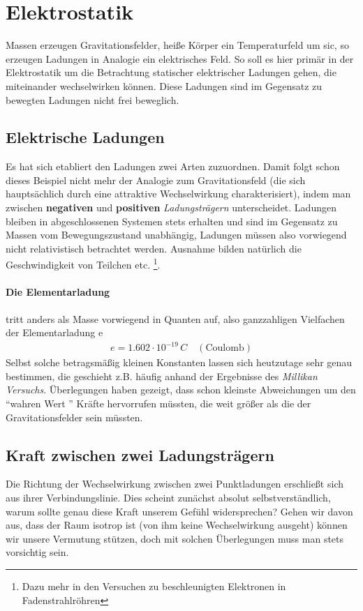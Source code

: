 \section{Elektrostatik}
\label{Elektrostatik}Massen erzeugen Gravitationsfelder, heiße Körper ein Temperaturfeld um sic, so erzeugen Ladungen in Analogie ein elektrisches Feld. So soll es hier primär in der Elektrostatik um die Betrachtung statischer elektrischer Ladungen gehen, die miteinander wechselwirken können. Diese Ladungen sind im Gegensatz zu bewegten Ladungen nicht frei beweglich.
\subsection{Elektrische Ladungen}
Es hat sich etabliert den Ladungen zwei Arten zuzuordnen. Damit folgt schon dieses Beispiel nicht mehr der Analogie zum Gravitationsfeld (die sich hauptsächlich  durch eine attraktive Wechselwirkung charakterisiert), indem man zwischen \textbf{negativen} und \textbf{positiven} \textit{Ladungsträgern} unterscheidet. Ladungen bleiben in abgeschlossenen Systemen stets erhalten und sind im Gegensatz zu Massen vom Bewegungszustand unabhängig, Ladungen müssen also vorwiegend nicht relativistisch betrachtet werden. Ausnahme bilden natürlich die Geschwindigkeit von Teilchen etc. \footnote{Dazu mehr in den Versuchen zu beschleunigten Elektronen in Fadenstrahlröhren}. \\
\begin{center}\end{center}
%
%
\paragraph{Die Elementarladung} tritt anders als Masse vorwiegend in Quanten auf, also ganzzahligen Vielfachen der Elementarladung e
\begin{align} \label{kons:Elementarladung}
e = 1.602 \cdot 10^{-19} \, C  \quad \mathrm{(Coulomb)}
\end{align}Selbst solche betragsmäßig kleinen Konstanten lassen sich heutzutage sehr genau bestimmen, die geschieht z.B. häufig anhand der Ergebnisse des \textit{Millikan Versuchs}. Überlegungen haben gezeigt, dass schon kleinste Abweichungen um den "`wahren Wert "' Kräfte hervorrufen müssten, die weit größer als die der Gravitationsfelder sein müssten.

\subsection{Kraft zwischen zwei Ladungsträgern}
Die Richtung der Wechselwirkung zwischen zwei Punktladungen erschließt sich aus ihrer Verbindungslinie. Dies scheint zunächst absolut selbstverständlich, warum sollte genau diese Kraft unserem Gefühl widersprechen? Gehen wir davon aus, dass der Raum isotrop ist (von ihm keine Wechselwirkung ausgeht) können wir unsere Vermutung stützen, doch mit solchen Überlegungen muss man stets vorsichtig sein.

